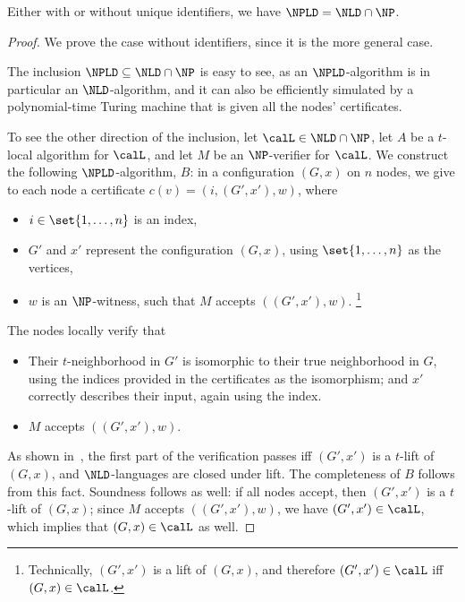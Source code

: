 \begin{theorem}
	Either with or without unique identifiers,
	we have $\NPLD = \NLD \cap \NP$.
	\label{thm:NPLD}
\end{theorem}
\begin{proof}
	We prove the case without identifiers, since it is the more general case.

	The inclusion $\NPLD \subseteq \NLD \cap \NP$
	is easy to see, as an $\NPLD$-algorithm is in particular an $\NLD$-algorithm,
	and it can also be efficiently simulated by a polynomial-time Turing machine that is given all the nodes' certificates.

	To see the other direction of the inclusion, let $\calL \in \NLD \cap \NP$,
	let $A$ be a $t$-local algorithm for $\calL$, and let $M$ be an $\NP$-verifier for $\calL$.
	We construct the following $\NPLD$-algorithm, $B$:
	in a configuration $(G, x)$ on $n$ nodes,
	we give to each node a certificate $c(v) = ( i, (G', x'), w)$,
	where
	\begin{itemize}
		\item $i \in \set{1,\ldots,n}$ is an index,
		\item $G'$ and $x'$ represent the configuration $(G,x)$, using $\set{1,\ldots,n}$ as the vertices,
		\item $w$ is an $\NP$-witness, such that $M$ accepts $( (G', x'), w )$.%
			\footnote{Technically, $(G', x')$ is a lift of $(G, x)$, and therefore  
			$(G', x') \in \calL$ iff $(G, x) \in \calL$.}
	\end{itemize}
	The nodes locally verify that
	\begin{itemize}
		\item Their $t$-neighborhood in $G'$ is isomorphic to their true neighborhood in $G$,
			using the indices provided in the certificates as the isomorphism;
			and $x'$ correctly describes their input, again using the index.
		\item $M$ accepts $( (G', x'), w)$.
	\end{itemize}
	As shown in~\cite{fraigniaud2013can},
	the first part of the verification passes iff $(G', x')$ is a $t$-lift of $(G, x)$,
	and $\NLD$-languages are closed under lift.
	The completeness of $B$ follows from this fact.
	Soundness follows as well:
	if all nodes accept, then $(G', x')$ is a $t$-lift of $(G, x)$;
	since $M$ accepts $( (G', x'), w)$, we have $(G', x') \in \calL$,
	which implies that $(G, x) \in \calL$ as well.
\end{proof}
